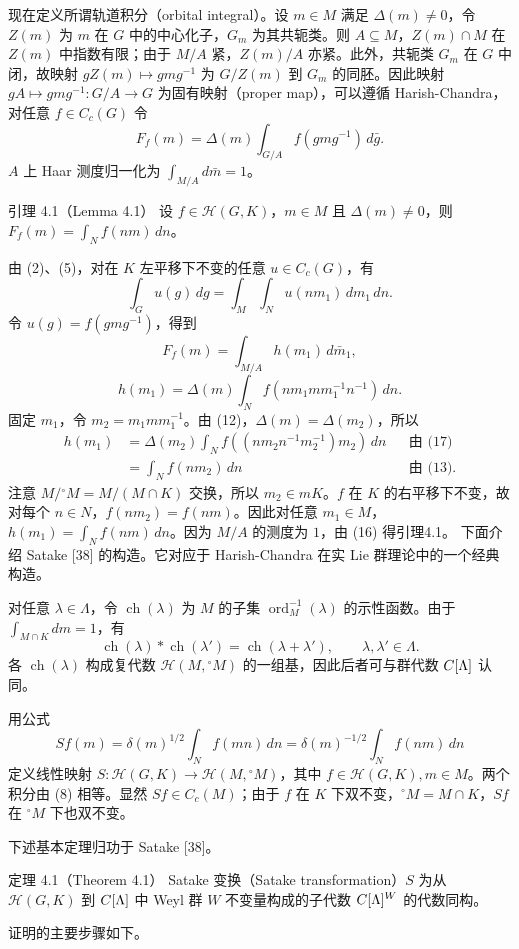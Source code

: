 现在定义所谓轨道积分（orbital integral）。设 $m\in M$ 满足 $\Delta(m)\ne0$，令 $Z(m)$ 为 $m$ 在 $G$ 中的中心化子，$G_m$ 为其共轭类。则 $A\subseteq M$，$Z(m)\cap M$ 在 $Z(m)$ 中指数有限；由于 $M/A$ 紧，$Z(m)/A$ 亦紧。此外，共轭类 $G_m$ 在 $G$ 中闭，故映射 $gZ(m)\mapsto gmg^{-1}$ 为 $G/Z(m)$ 到 $G_m$ 的同胚。因此映射 $gA\mapsto gmg^{-1}:G/A\to G$ 为固有映射（proper map），可以遵循 Harish-Chandra，对任意 $f\in C_c(G)$ 令
\[
F_f(m)=\Delta(m)\int_{G/A}f(gmg^{-1})\,d\bar g.\tag{14}
\]
$A$ 上 Haar 测度归一化为 $\int_{M/A}d\bar m=1$。
\begin{originaltheorem}{引理 4.1（Lemma 4.1）}
设 $f\in\mathcal H(G,K)$，$m\in M$ 且 $\Delta(m)\ne0$，则 $F_f(m)=\int_Nf(nm)\,dn$。
\end{originaltheorem}
由 (2)、(5)，对在 $K$ 左平移下不变的任意 $u\in C_c(G)$，有
\[
\int_Gu(g)\,dg=\int_M\int_Nu(nm_1)\,dm_1\,dn.\tag{15}
\]
令 $u(g)=f(gmg^{-1})$，得到
\[
F_f(m)=\int_{M/A}h(m_1)\,d\bar m_1,\tag{16}
\]
\[
h(m_1)=\Delta(m)\int_Nf(nm_1mm_1^{-1}n^{-1})\,dn.\tag{17}
\]
固定 $m_1$，令 $m_2=m_1mm_1^{-1}$。由 (12)，$\Delta(m)=\Delta(m_2)$，所以
\[
\begin{aligned}
h(m_1)&=\Delta(m_2)\int_Nf((nm_2n^{-1}m_2^{-1})m_2)\,dn&&\text{由 (17)}\\
&=\int_Nf(nm_2)\,dn&&\text{由 (13)}.
\end{aligned}
\]
注意 $M/{}^\circ M=M/(M\cap K)$ 交换，所以 $m_2\in mK$。$f$ 在 $K$ 的右平移下不变，故对每个 $n\in N$，$f(nm_2)=f(nm)$。因此对任意 $m_1\in M$，$h(m_1)=\int_Nf(nm)\,dn$。因为 $M/A$ 的测度为 $1$，由 (16) 得引理4.1。
下面介绍 Satake [38] 的构造。它对应于 Harish-Chandra 在实 Lie 群理论中的一个经典构造。

对任意 $\lambda\in\Lambda$，令 $\operatorname{ch}(\lambda)$ 为 $M$ 的子集 $\operatorname{ord}_M^{-1}(\lambda)$ 的示性函数。由于 $\int_{M\cap K}dm=1$，有
\[
\operatorname{ch}(\lambda)*\operatorname{ch}(\lambda')=\operatorname{ch}(\lambda+\lambda'),\qquad\lambda,\lambda'\in\Lambda.\tag{18}
\]
各 $\operatorname{ch}(\lambda)$ 构成复代数 $\mathcal H(M,{}^\circ M)$ 的一组基，因此后者可与群代数 $C[\Lambda]$ 认同。

用公式
\[
Sf(m)=\delta(m)^{1/2}\int_Nf(mn)\,dn=\delta(m)^{-1/2}\int_Nf(nm)\,dn\tag{19}
\]
定义线性映射 $S:\mathcal H(G,K)\to\mathcal H(M,{}^\circ M)$，其中 $f\in\mathcal H(G,K),m\in M$。两个积分由 (8) 相等。显然 $Sf\in C_c(M)$；由于 $f$ 在 $K$ 下双不变，$^\circ M=M\cap K$，$Sf$ 在 $^\circ M$ 下也双不变。

下述基本定理归功于 Satake [38]。
\begin{originaltheorem}{定理 4.1（Theorem 4.1）}
Satake 变换（Satake transformation）$S$ 为从 $\mathcal H(G,K)$ 到 $C[\Lambda]$ 中 Weyl 群 $W$ 不变量构成的子代数 $C[\Lambda]^W$ 的代数同构。
\end{originaltheorem}
证明的主要步骤如下。

